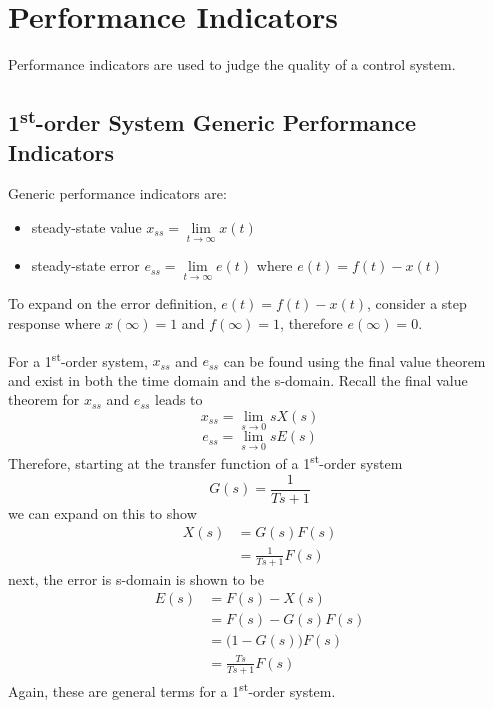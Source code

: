 \documentclass[12pt,letter]{article}
\begin{document}
%	
%	

	\setcounter{section}{4}	
	\setcounter{figure}{0}   
	\renewcommand\thefigure{\thesection.\arabic{figure}}


\section{Performance Indicators}

Performance indicators are used to judge the quality of a control system. 

\subsection{1\textsuperscript{st}-order System Generic Performance Indicators}


Generic performance indicators are:
\begin{itemize}
	\item steady-state value $x_{ss} = \lim\limits_{t \rightarrow \infty} x(t)$
	\item steady-state error $e_{ss} = \lim\limits_{t \rightarrow \infty} e(t)$ where  $e(t) = f(t) - x(t)$
\end{itemize}
To expand on the error definition, $e(t) = f(t) - x(t)$, consider a step response where $x(\infty) =1$ and $f(\infty) =1$, therefore $e(\infty)=0$. 

For a 1\textsuperscript{st}-order system, $x_{ss}$ and $e_{ss}$ can be found using the final value theorem and exist in both the time domain and the s-domain. Recall the final value theorem for  $x_{ss}$ and $e_{ss}$ leads to
\begin{equation}
x_{ss} = \lim\limits_{s \rightarrow 0} s X(s)
\end{equation}
\begin{equation}
e_{ss} = \lim\limits_{s \rightarrow 0} s E(s)
\end{equation}
Therefore, starting at the transfer function of a 1\textsuperscript{st}-order system
\begin{equation}
G(s) = \frac{1}{Ts+1}
\end{equation}
we can expand on this to show
\begin{align}
X(s) &= G(s)F(s) \\
&= \frac{1}{Ts +1}F(s) \nonumber
\end{align}
next, the error is s-domain is shown to be
\begin{align}
E(s) &= F(s) - X(s) \\
&= F(s) - G(s)F(s) \\ \nonumber
&= \big( 1-G(s) \big) F(s) \\ \nonumber
&= \frac{Ts}{Ts +1} F(s) \nonumber
\end{align}
Again, these are general terms for a 1\textsuperscript{st}-order system. 
\end{document}
